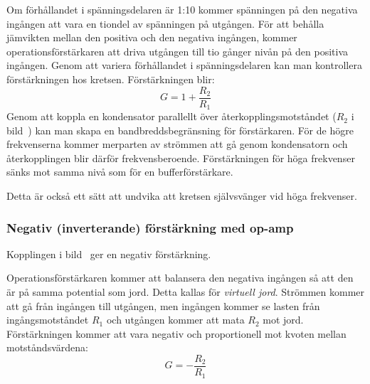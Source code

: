 Om förhållandet i spänningsdelaren är 1:10 kommer spänningen på den negativa
ingången att vara en tiondel av spänningen på utgången.
För att behålla jämvikten mellan den positiva och den negativa ingången, kommer
operationsförstärkaren att driva utgången till tio gånger nivån på den positiva
ingången.
Genom att variera förhållandet i spänningsdelaren kan man kontrollera
förstärkningen hos kretsen.
Förstärkningen blir:
\[G = 1+ \dfrac{R_2}{R_1}\]
Genom att koppla en kondensator parallellt över återkopplingsmotståndet
(\(R_2\) i bild~) kan man skapa en bandbreddsbegränsning
för förstärkaren.
För de högre frekvenserna kommer merparten av strömmen att gå genom
kondensatorn och återkopplingen blir därför frekvensberoende.
Förstärkningen för höga frekvenser sänks mot samma nivå som för en
bufferförstärkare.

Detta är också ett sätt att undvika att kretsen självsvänger vid höga
frekvenser.

\subsubsection{Negativ (inverterande) förstärkning med op-amp}

Kopplingen i bild~ ger en negativ förstärkning.


Operationsförstärkaren kommer att balansera den negativa ingången så att den
är på samma potential som jord.
Detta kallas för \emph{virtuell jord}.
Strömmen kommer att gå från ingången till utgången, men ingången kommer se
lasten från ingångsmotståndet \(R_1\) och utgången kommer att mata \(R_2\) mot
jord.
Förstärkningen kommer att vara negativ och proportionell mot kvoten mellan
motståndsvärdena:
\[G = -\dfrac{R_2}{R_1}\]
